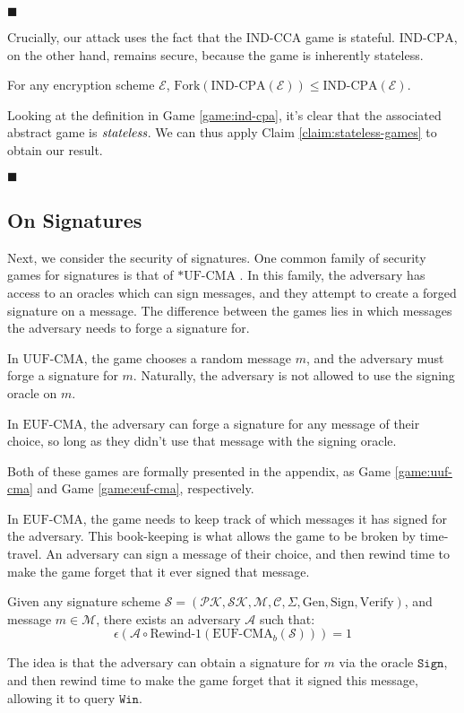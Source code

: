 $\blacksquare$

Crucially, our attack uses the fact that the $\text{IND-CCA}$ game
is stateful.
$\text{IND-CPA}$, on the other hand, remains secure, because
the game is inherently stateless.

\begin{claim}
\label{claim:ind-cpa-secure}
For any encryption scheme $\mathcal{E}$,
$\text{Fork}(\text{IND-CPA}(\mathcal{E})) \leq \text{IND-CPA}(\mathcal{E})$.
\end{claim}

Looking at the definition in Game \ref{game:ind-cpa}, it's clear
that the associated abstract game is $\emph{stateless}$.
We can thus apply Claim \ref{claim:stateless-games} to obtain our result.

$\blacksquare$

\subsection{On Signatures}

Next, we consider the security of signatures.
One common family of security games for signatures is that of
$*\text{UF-CMA}$ \cite{gmr88}.
In this family, the adversary has access to an oracles which can
sign messages, and they attempt to create a forged signature on a message.
The difference between the games lies in which messages the adversary
needs to forge a signature for.

In $\text{UUF-CMA}$, the game chooses a random message $m$, and the adversary
must forge a signature for $m$.
Naturally, the adversary is not allowed to use the signing oracle on
$m$.

In $\text{EUF-CMA}$, the adversary can forge a signature for any message
of their choice, so long as they didn't use that message
with the signing oracle.

Both of these games are formally presented in the appendix,
as Game \ref{game:uuf-cma} and Game \ref{game:euf-cma}, respectively.

In $\text{EUF-CMA}$, the game needs to keep track of which messages
it has signed for the adversary.
This book-keeping is what allows the game to be broken by time-travel.
An adversary can sign a message of their choice, and then rewind time
to make the game forget that it ever signed that message.

\begin{claim}
\label{claim:euf-cma}
Given any signature scheme
$\mathcal{S} = (\mathcal{PK}, \mathcal{SK}, \mathcal{M}, \mathcal{C}, \Sigma, \text{Gen}, \text{Sign}, \text{Verify})$, and message $m \in \mathcal{M}$,
there exists an adversary $\mathcal{A}$ such that:
$$
\epsilon(\mathcal{A} \circ \text{Rewind-1}(\text{EUF-CMA}_b(\mathcal{S}))) = 1
$$
\end{claim}
The idea is that the adversary can obtain a signature for $m$
via the oracle $\texttt{Sign}$, and then rewind time to make the game
forget that it signed this message, allowing it to query $\texttt{Win}$.

